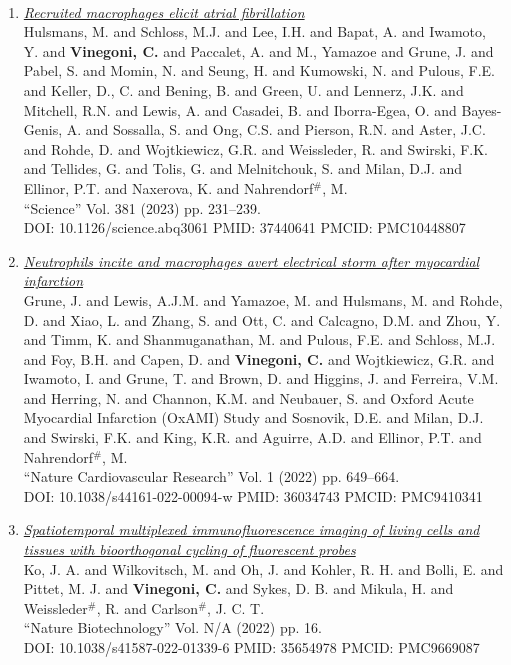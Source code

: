 \documentclass{resume}
\begin{document}
\begin{category}{~~}
\begin{enumerate}
\item \href{https://cvinegoni.github.io/assets/pdf/papers/2023-SCIENCE.pdf}{\it  Recruited macrophages elicit atrial fibrillation} \\ Hulsmans, M. and Schloss, M.J. and Lee, I.H. and Bapat, A. and Iwamoto, Y. and {\bf Vinegoni, C.} and Paccalet, A. and M., Yamazoe and Grune, J. and Pabel, S. and Momin, N. and Seung, H. and Kumowski, N. and Pulous, F.E. and Keller, D., C. and Bening, B. and Green, U. and Lennerz, J.K. and Mitchell, R.N. and Lewis, A. and Casadei, B. and Iborra-Egea, O. and Bayes-Genis, A. and Sossalla, S. and Ong, C.S. and Pierson, R.N. and Aster, J.C. and Rohde, D. and Wojtkiewicz, G.R. and Weissleder, R. and Swirski, F.K. and Tellides, G. and Tolis, G. and Melnitchouk, S. and Milan, D.J. and Ellinor, P.T. and Naxerova, K. and Nahrendorf$^\#$, M. \\ ``Science'' Vol. 381 (2023) pp. 231–239. \\ DOI: 10.1126/science.abq3061 PMID: 37440641 PMCID: PMC10448807

\item \href{https://cvinegoni.github.io/assets/pdf/papers/2022-NCR-2.pdf}{\it  Neutrophils incite and macrophages avert electrical storm after myocardial infarction}\\ Grune, J. and Lewis, A.J.M. and Yamazoe, M. and Hulsmans, M. and Rohde, D. and Xiao, L. and Zhang, S. and Ott, C. and Calcagno, D.M. and Zhou, Y. and Timm, K. and Shanmuganathan, M. and Pulous, F.E. and Schloss, M.J. and Foy, B.H. and Capen, D. and {\bf Vinegoni, C.} and Wojtkiewicz, G.R. and Iwamoto, I. and Grune, T. and Brown, D. and Higgins, J. and Ferreira, V.M. and Herring, N. and Channon, K.M. and Neubauer, S. and Oxford Acute Myocardial Infarction (OxAMI) Study and Sosnovik, D.E. and Milan, D.J. and Swirski, F.K. and King, K.R. and Aguirre, A.D. and Ellinor, P.T. and Nahrendorf$^\#$, M. \\ ``Nature Cardiovascular Research'' Vol. 1 (2022) pp. 649–664. \\ DOI: 10.1038/s44161-022-00094-w PMID: 36034743 PMCID: PMC9410341

\item \href{https://cvinegoni.github.io/assets/pdf/papers/2022-NB.pdf}{\it  Spatiotemporal multiplexed immunofluorescence imaging of living cells and tissues with bioorthogonal cycling of fluorescent probes} \\ Ko, J. A. and Wilkovitsch, M. and Oh, J. and Kohler, R. H. and Bolli, E. and Pittet, M. J. and {\bf Vinegoni, C.} and Sykes, D. B. and Mikula, H. and Weissleder$^\#$, R. and Carlson$^\#$, J. C. T. \\ ``Nature Biotechnology'' Vol. N/A (2022) pp. 16. \\ DOI: 10.1038/s41587-022-01339-6 PMID: 35654978 PMCID: PMC9669087 


\end{enumerate}
\end{category}
\end{document}
